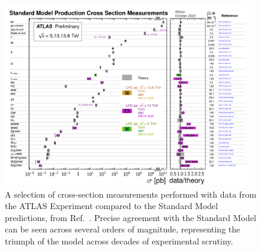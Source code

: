 \begin{figure}[htb]
    \centering
    \includegraphics[width=0.95\textwidth]{fig/atlas/atlas_xsecs_2023.pdf}
    \caption[A selection of cross-section measurements performed with data from the ATLAS Experiment]{
        A selection of cross-section measurements performed with data from the ATLAS Experiment compared to the Standard Model predictions, from Ref.~\cite{ATL-PHYS-PUB-2023-039}. 
        Precise agreement with the Standard Model can be seen across several orders of magnitude, representing the triumph of the model across decades of experimental scrutiny. 
    }
    \label{fig:atlas_xsecs}
\end{figure}

